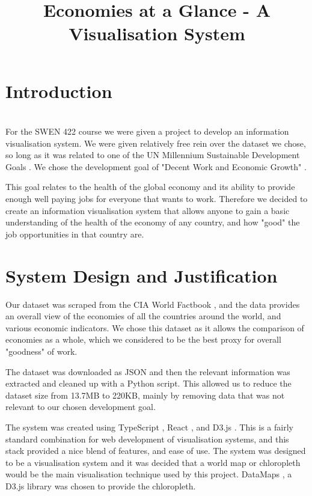 \documentclass[10pt, journal]{IEEEtran}
\begin{document}
\title{Economies at a Glance - A Visualisation System}
\author{
}
\maketitle

\section{Introduction}
~\\
For the SWEN 422 course we were given a project to develop an information visualisation system. We were given relatively free rein over the dataset we chose, so long as it was related to one of the UN Millennium Sustainable Development Goals \cite{devgoals}. We chose the development goal of "Decent Work and Economic Growth" \cite{dec}. 

This goal relates to the health of the global economy and its ability to provide enough well paying jobs for everyone that wants to work. Therefore we decided to create an information visualisation system that allows anyone to gain a basic understanding of the health of the economy of any country, and how "good" the job opportunities in that country are.



\section{System Design and Justification}

Our dataset was scraped from the CIA World Factbook \cite{cia}, and the data provides an overall view of the economies of all the countries around the world, and various economic indicators. We chose this dataset as it allows the comparison of economies as a whole, which we considered to be the best proxy for overall "goodness" of work.

The dataset was downloaded as JSON and then the relevant information was extracted and cleaned up with a Python script. This allowed us to reduce the dataset size from 13.7MB to 220KB, mainly by removing data that was not relevant to our chosen development goal.

The system was created using TypeScript \cite{ts}, React \cite{react}, and D3.js \cite{d3}. This is a fairly standard combination for web development of visualisation systems, and this stack provided a nice blend of features, and ease of use. The system was designed to be a visualisation system and it was decided that a world map or chloropleth would be the main visualisation technique used by this project. DataMaps \cite{dms}, a D3.js library was chosen to provide the chloropleth.
\end{document}
